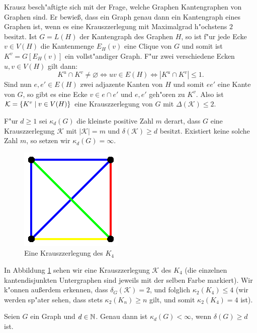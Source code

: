 Krausz \cite{Krausz43} besch"aftigte sich mit der Frage, welche Graphen Kantengraphen von Graphen sind. Er bewie{\ss}, dass ein Graph genau dann ein Kantengraph eines Graphen ist, wenn es eine Krauszzerlegung mit Maximalgrad h"ochstens $2$ besitzt. Ist $G=L(H)$ der Kantengraph des Graphen $H$, so ist f"ur jede Ecke $v\in V(H)$ die Kantenmenge $E_H(v)$ eine Clique von $G$ und somit ist $K^{v}=G[E_H(v)]$ ein vollst"andiger Graph. F"ur zwei verschiedene Ecken $u,v\in V(H)$ gilt dann:
$$K^{u}\cap K^{v} \neq \varnothing \Leftrightarrow uv \in E(H) \Leftrightarrow |K^{u} \cap K^{v}| \leq 1.$$
Sind nun $e,e'\in E(H)$ zwei adjazente Kanten von $H$ und somit $ee'$ eine Kante von $G$, so gibt es eine Ecke $v\in e\cap e'$ und $e,e'$ geh"oren zu $K^{v}$. Also ist $\mathcal{K} = \{K^{v} \;|\; v\in V(H) \}$ eine Krauszzerlegung von $G$ mit $\Delta(\mathcal{K}) \leq 2$.

F"ur $d \geq 1$ sei $\kappa_d(G)$ die kleinste positive Zahl $m$ derart, dass $G$ eine Krauszzerlegung $\mathcal K$ mit $|\mathcal K| = m$ und $\delta(\mathcal K) \geq d$ besitzt. Existiert keine solche Zahl $m$, so setzen wir $\kappa_{d}(G) = \infty$.

\begin{figure}[htb]
  \centering
  \includegraphics{images/krauszzerlegungk4.eps}
  \caption{Eine Krauszzerlegung des $K_4$}
  \label{fig:KrauszzerlegungK4}
\end{figure}
In Abbildung \ref{fig:KrauszzerlegungK4} sehen wir eine Krauszzerlegung $\mathcal{K}$ des $K_4$ (die einzelnen kantendisjunkten Untergraphen sind jeweils mit der selben Farbe markiert). Wir k"onnen au{\ss}erdem erkennen, dass $\delta_{G}(\mathcal{K}) = 2$, und folglich $\kappa_{2}(K_4) \leq 4$ (wir werden sp"ater sehen, dass stets $\kappa_{2}(K_n) \geq n$ gilt, und somit $\kappa_{2}(K_{4}) = 4$ ist). 
\begin{lemma}
  Seien $G$ ein Graph und $d\in {\mathbb{N}}$. Genau dann ist $\kappa_{d}(G) < \infty$, wenn $\delta(G) \geq d$ ist. 
  \label{lm:krauszexistenz}
\end{lemma}

